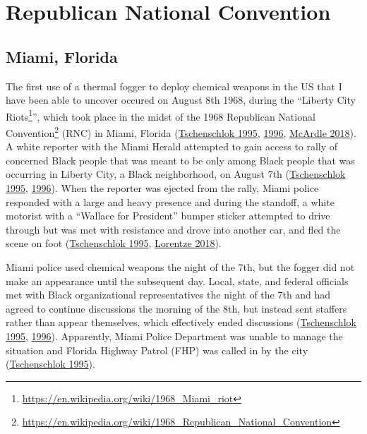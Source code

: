 \documentclass[
  11pt,
]{krantz}
\renewcommand{\href}[2]{#2\footnote{\url{#1}}}
\begin{document}
\hypertarget{republican-national-convention}{%
\section{Republican National Convention}\label{republican-national-convention}}

\hypertarget{MiamiFL1968_08_08}{%
\subsection{Miami, Florida}\label{MiamiFL1968_08_08}}

The first use of a thermal fogger to deploy chemical weapons in the US that I have been able to uncover occured on August 8th 1968, during the ``\href{https://en.wikipedia.org/wiki/1968_Miami_riot}{Liberty City Riots}'', which took place in the midst of the \href{https://en.wikipedia.org/wiki/1968_Republican_National_Convention}{1968 Republican National Convention} (RNC) in Miami, Florida (\protect\hyperlink{ref-Tschenschlok1995}{Tschenschlok 1995}, \protect\hyperlink{ref-Tschenschlok1996}{1996}, \protect\hyperlink{ref-McArdle2018}{McArdle 2018}).
A white reporter with the Miami Herald attempted to gain access to rally of concerned Black people that was meant to be only among Black people that was occurring in Liberty City, a Black neighborhood, on August 7th (\protect\hyperlink{ref-Tschenschlok1995}{Tschenschlok 1995}, \protect\hyperlink{ref-Tschenschlok1996}{1996}).
When the reporter was ejected from the rally, Miami police responded with a large and heavy presence and during the standoff, a white motorist with a ``Wallace for President'' bumper sticker attempted to drive through but was met with resistance and drove into another car, and fled the scene on foot (\protect\hyperlink{ref-Tschenschlok1995}{Tschenschlok 1995}, \protect\hyperlink{ref-Lorentzen2018}{Lorentze 2018}).

Miami police used chemical weapons the night of the 7th, but the fogger did not make an appearance until the subsequent day.
Local, state, and federal officials met with Black organizational representatives the night of the 7th and had agreed to continue discussions the morning of the 8th, but instead sent staffers rather than appear themselves, which effectively ended discussions (\protect\hyperlink{ref-Tschenschlok1995}{Tschenschlok 1995}, \protect\hyperlink{ref-Tschenschlok1996}{1996}).
Apparently, Miami Police Department was unable to manage the situation and Florida Highway Patrol (FHP) was called in by the city (\protect\hyperlink{ref-Tschenschlok1995}{Tschenschlok 1995}).
\end{document}
